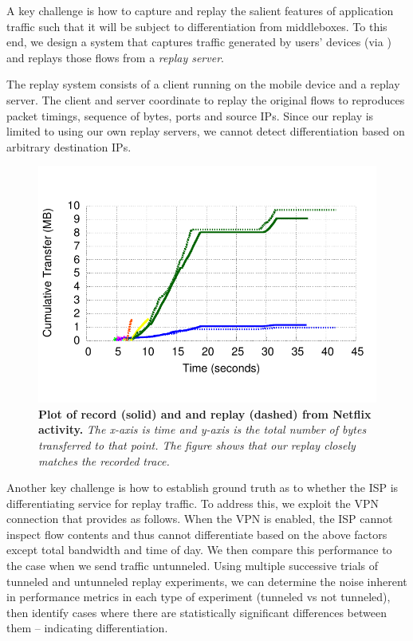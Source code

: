 A key challenge is how to capture and replay 
the salient features of application traffic such that it will be subject to differentiation 
from middleboxes. To this end, we design a system that captures 
traffic generated by users' devices (via \meddle) and replays those flows 
from a \emph{replay server}. 

The replay system consists of a client running on the mobile device and a replay server. 
The client and server coordinate to replay the original flows to reproduces packet timings, 
sequence of bytes, ports and source IPs. Since our replay is limited to using our own replay servers,
 we cannot detect differentiation based on arbitrary destination IPs. 


\begin{figure}
\centering
\includegraphics[width=0.9\linewidth]{plots/netflix_seqnum_wifi_vs_cell.pdf}
\caption{\textbf{Plot of record (solid) and and replay (dashed) from Netflix activity.} \emph{The x-axis is time and y-axis is the 
total number of bytes transferred to that point. The figure shows that our replay closely matches 
the recorded trace.}}
\vspace{\postfigspace}
\label{fig:replaySimilarity}
\end{figure}

Another key challenge is how to establish ground truth as to whether the ISP is 
differentiating service for replay traffic. To address this, we exploit the VPN connection 
that \meddle provides as follows. When the 
VPN is enabled, the ISP cannot inspect flow contents and thus cannot differentiate based 
on the above factors except total bandwidth and time of day. 
We then compare this performance to the case when we send traffic untunneled.  
Using multiple successive trials of tunneled and untunneled replay experiments, 
we can determine the noise inherent in performance metrics in each type of experiment (tunneled vs not tunneled), then 
identify cases where there are statistically significant differences between 
them -- indicating differentiation. 

